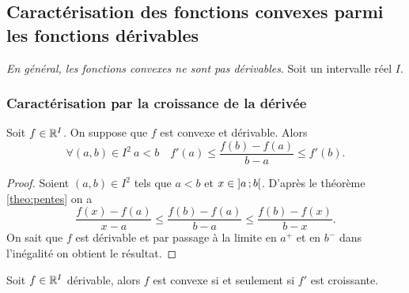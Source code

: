 \subsection[Caractérisation des fonctions convexes dans \(\deriv{I}{\R}\)]{Caractérisation des fonctions convexes parmi les fonctions dérivables}

\emph{En général, les fonctions convexes ne sont pas dérivables}. Soit un intervalle réel \(I\).

\subsubsection{Caractérisation par la croissance de la dérivée}

\begin{theo}\label{theo:croisderiv}
  Soit \(f \in \mathbb{R}^I\). On suppose que \(f\) est convexe et dérivable. Alors
  \begin{equation}
    \forall (a,b) \in I^2 \ a<b \quad f'(a) \leqslant \frac{f(b)-f(a)}{b-a} \leqslant f'(b).
  \end{equation}
\end{theo}
\begin{proof}
  Soient \((a,b) \in I^2\) tels que \(a <b\) et \(x \in \left] a \, ;  b \right[\). D'après le théorème~
\ref{theo:pentes} on a
  \begin{equation}
    \frac{f(x)-f(a)}{x-a} \leqslant \frac{f(b)-f(a)}{b-a} \leqslant \frac{f(b)-f(x)}{b-x}.
  \end{equation}
  On sait que \(f\) est dérivable et par passage à la limite en \(a^{+}\) et en \(b^{-}\) dans l'inégalité on obtient le résultat.
\end{proof}
\begin{theo}
  Soit \(f \in \mathbb{R}^I\) dérivable, alors \(f\) est convexe si et seulement si \(f'\) est croissante.
\end{theo}
